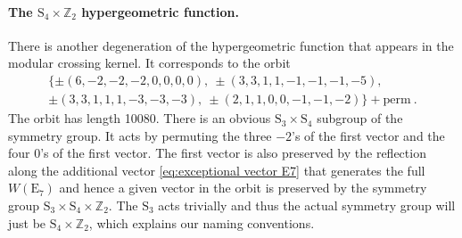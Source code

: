 \documentclass[12pt,a4paper]{article}
\newcommand\ZZ{\mathbb{Z}}
\begin{document}
\paragraph{The $\mathrm{S}_4 \times \ZZ_2$ hypergeometric function.} There is another degeneration of the hypergeometric function that appears in the modular crossing kernel. It corresponds to the orbit
\begin{multline} 
\{\pm (6,-2,-2,-2,0,0,0,0),\ \pm (3,3,1,1,-1,-1,-1,-5),\\
\pm (3,3,1,1,1,-3,-3,-3), \ \pm (2,1,1,0,0,-1,-1,-2)\}+\text{perm}\ .
\end{multline}
The orbit has length \num{10080}. There is an obvious $\mathrm{S}_3 \times \mathrm{S}_4$ subgroup of the symmetry group. It acts by permuting the three $-2$'s of the first vector and the four $0$'s of the first vector. The first vector is also preserved by the reflection along the additional vector \eqref{eq:exceptional vector E7} that generates the full $W(\mathrm{E}_7)$ and hence a given vector in the orbit is preserved by the symmetry group $\mathrm{S}_3 \times \mathrm{S}_4 \times \ZZ_2$. The $\mathrm{S}_3$ acts trivially and thus the actual symmetry group will just be $\mathrm{S}_4 \times \ZZ_2$, which explains our naming conventions.
\end{document}
